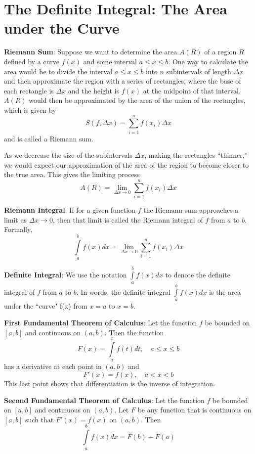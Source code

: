 \documentclass[]{book}
\theoremstyle{definition}
\theoremstyle{definition}
\theoremstyle{definition}
\theoremstyle{remark}
\begin{document}
\section{The Definite Integral: The Area under the
Curve}\label{the-definite-integral-the-area-under-the-curve}

\textbf{Riemann Sum}: Suppose we want to determine the area \(A(R)\) of
a region \(R\) defined by a curve \(f(x)\) and some interval
\(a\le x \le b\). One way to calculate the area would be to divide the
interval \(a\le x\le b\) into \(n\) subintervals of length \(\Delta x\)
and then approximate the region with a series of rectangles, where the
base of each rectangle is \(\Delta x\) and the height is \(f(x)\) at the
midpoint of that interval. \(A(R)\) would then be approximated by the
area of the union of the rectangles, which is given by
\[S(f,\Delta x)=\sum\limits_{i=1}^n f(x_i)\Delta x\] and is called a
Riemann sum.

As we decrease the size of the subintervals \(\Delta x\), making the
rectangles ``thinner,'' we would expect our approximation of the area of
the region to become closer to the true area. This gives the limiting
process
\[A(R)=\lim\limits_{\Delta x\to 0}\sum\limits_{i=1}^n f(x_i)\Delta x\]

\textbf{Riemann Integral}: If for a given function \(f\) the Riemann sum
approaches a limit as \(\Delta x \to 0\), then that limit is called the
Riemann integral of \(f\) from \(a\) to \(b\). Formally,
\[\int\limits_a^b f(x) dx= \lim\limits_{\Delta x\to 0} \sum\limits_{i=1}^n f(x_i)\Delta x\]

\textbf{Definite Integral}: We use the notation
\(\int\limits_a^b f(x) dx\) to denote the definite integral of \(f\)
from \(a\) to \(b\). In words, the definite integral
\(\int\limits_a^b f(x)dx\) is the area under the ``curve" f(x) from
\(x=a\) to \(x=b\).

\textbf{First Fundamental Theorem of Calculus}: Let the function \(f\)
be bounded on \([a,b]\) and continuous on \((a,b)\). Then the function
\[F(x)=\int\limits_a^x f(t)dt, \quad a\le x\le b\] has a derivative at
each point in \((a,b)\) and \[F'(x)=f(x), \quad a<x<b\] This last point
shows that differentiation is the inverse of integration.

\textbf{Second Fundamental Theorem of Calculus}: Let the function \(f\)
be bounded on \([a,b]\) and continuous on \((a,b)\). Let \(F\) be any
function that is continuous on \([a,b]\) such that \(F'(x)=f(x)\) on
\((a,b)\). Then \[\int\limits_a^bf(x)dx = F(b)-F(a)\]
\end{document}
